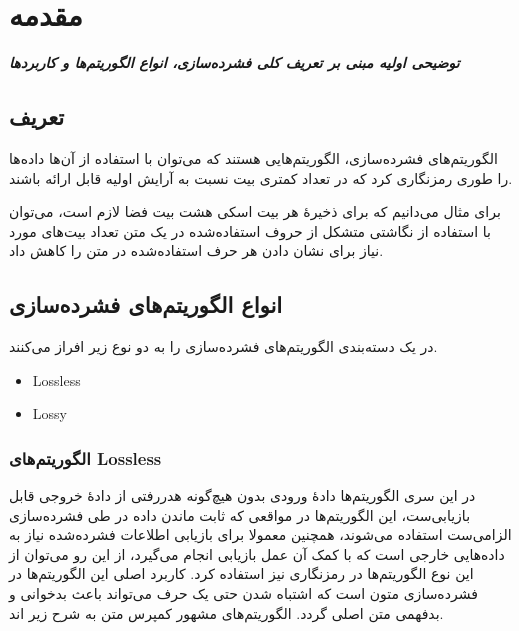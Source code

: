 \chapter{مقدمه}
\noindent
\textbf{
	\textit{
		توضیحی اولیه مبنی بر تعریف کلی فشرده‌سازی، انواع الگوریتم‌ها و کاربردها
	}
}
\pagebreak
\section{تعریف}

الگوریتم‌های فشرده‌سازی، الگوریتم‌هایی هستند که می‌توان با استفاده از آن‌ها داده‌ها را طوری رمزنگاری کرد که در تعداد کمتری بیت نسبت به آرایش اولیه
قابل ارائه باشند.

برای مثال می‌دانیم که برای ذخیرهٔ هر بیت اسکی هشت بیت فضا لازم است، می‌توان با استفاده از نگاشتی متشکل از حروف استفاده‌شده در 
یک متن تعداد بیت‌های مورد نیاز برای نشان دادن هر حرف استفاده‌شده در متن را کاهش داد.

\section{انواع الگوریتم‌های فشرده‌سازی}

در یک دسته‌بندی الگوریتم‌های فشرده‌سازی را به دو نوع زیر افراز می‌کنند.
\begin{itemize}
	\item Lossless
	\item Lossy
\end{itemize}

\subsection{الگوریتم‌های Lossless}
در این سری الگوریتم‌ها دادهٔ ورودی بدون هیچ‌گونه هدررفتی از دادهٔ خروجی قابل بازیابی‌ست، این الگوریتم‌ها در مواقعی که 
ثابت ماندن داده در طی فشرده‌سازی الزامی‌ست استفاده می‌شوند، همچنین معمولا برای بازیابی اطلاعات فشرده‌شده نیاز به 
داده‌هایی خارجی است که با کمک آن عمل بازیابی انجام می‌گیرد، از این رو می‌توان از این نوع الگوریتم‌ها در رمزنگاری نیز 
استفاده کرد. کاربرد اصلی این الگوریتم‌ها در فشرده‌سازی متون است که اشتباه شدن حتی یک حرف می‌تواند باعث بدخوانی و 
بدفهمی متن اصلی گردد. الگوریتم‌های مشهور کمپرس متن به شرح زیر اند.


